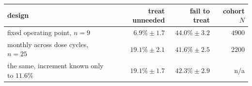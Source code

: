 \begin{tabular}{@{}lrrr@{}}
\toprule
\textbf{design} & \textbf{treat unneeded} & \textbf{fail to treat} & \textbf{cohort $N$} \\
\midrule
fixed operating point, $n=9$ & $6.9\% \pm 1.7$ & $44.0\% \pm 3.2$ & $4900$ \\
monthly across dose cycles, $n=25$ & $19.1\% \pm 2.1$ & $41.6\% \pm 2.5$ & $2200$ \\
\quad the same, increment known only to $11.6\%$ & $19.1\% \pm 1.7$ & $42.3\% \pm 2.9$ & n/a \\
\bottomrule
\end{tabular}
